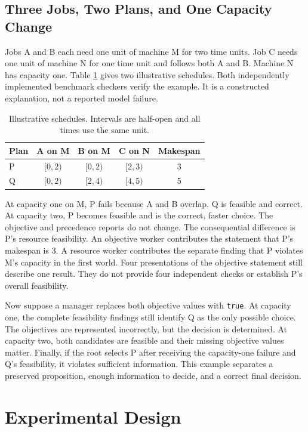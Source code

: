 \documentclass{svproc}
\begin{document}
\subsection{Three Jobs, Two Plans, and One Capacity Change}
Jobs A and B each need one unit of machine M for two time units. Job C needs one
unit of machine N for one time unit and follows both A and B. Machine N has
capacity one. Table \ref{tab:example} gives two illustrative schedules. Both
independently implemented benchmark checkers verify the example. It is a
constructed explanation, not a reported model failure.

\begin{table}[htbp]
\centering
\setlength{\tabcolsep}{8pt}
\caption{Illustrative schedules. Intervals are half-open and all times use the same unit.}
\label{tab:example}
\begin{tabular}{lcccc}\toprule
Plan & A on M & B on M & C on N & Makespan\\\midrule
P & $[0,2)$ & $[0,2)$ & $[2,3)$ & 3\\
Q & $[0,2)$ & $[2,4)$ & $[4,5)$ & 5\\
\bottomrule\end{tabular}
\end{table}

At capacity one on M, P fails because A and B overlap. Q is feasible and correct.
At capacity two, P becomes feasible and is the correct, faster choice. The
objective and precedence reports do not change. The consequential difference is
P's resource feasibility.
An objective worker contributes the statement that P's makespan is 3. A resource
worker contributes the separate finding that P violates M's capacity in the first
world. Four presentations of the objective statement still describe one result.
They do not provide four independent checks or establish P's overall feasibility.

Now suppose a manager replaces both objective values with \texttt{true}. At
capacity one, the complete feasibility findings still identify Q as the only
possible choice. The objectives are represented incorrectly, but the decision is
determined. At capacity two, both candidates are feasible and their missing
objective values matter. Finally, if the root selects P after receiving the
capacity-one failure and Q's feasibility, it violates sufficient information.
This example separates a preserved proposition, enough information to decide,
and a correct final decision.




\section{Experimental Design}
\end{document}
